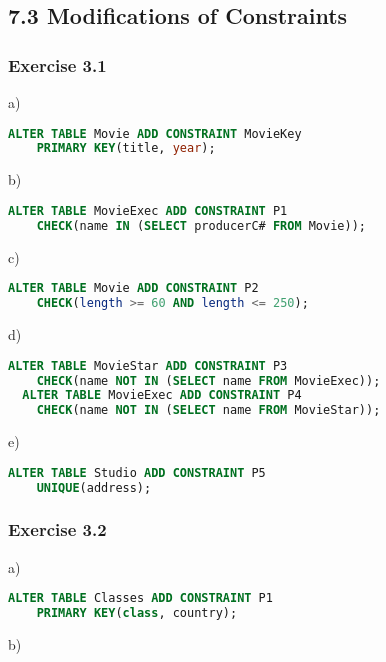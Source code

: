 \documentclass[../../main.tex]{subfiles}
\begin{document}
\subsection*{7.3 Modifications of Constraints}

\subsubsection*{Exercise 3.1}

a)

\begin{lstlisting}[language=sql]
  ALTER TABLE Movie ADD CONSTRAINT MovieKey
    PRIMARY KEY(title, year);
\end{lstlisting}

b)

\begin{lstlisting}[language=sql]
  ALTER TABLE MovieExec ADD CONSTRAINT P1
    CHECK(name IN (SELECT producerC# FROM Movie));
\end{lstlisting}

c)

\begin{lstlisting}[language=sql]
  ALTER TABLE Movie ADD CONSTRAINT P2
    CHECK(length >= 60 AND length <= 250);
\end{lstlisting}

d)

\begin{lstlisting}[language=sql]
  ALTER TABLE MovieStar ADD CONSTRAINT P3
    CHECK(name NOT IN (SELECT name FROM MovieExec));
  ALTER TABLE MovieExec ADD CONSTRAINT P4
    CHECK(name NOT IN (SELECT name FROM MovieStar));
\end{lstlisting}

e)

\begin{lstlisting}[language=sql]
  ALTER TABLE Studio ADD CONSTRAINT P5
    UNIQUE(address);
\end{lstlisting}

\subsubsection*{Exercise 3.2}

a)

\begin{lstlisting}[language=sql]
  ALTER TABLE Classes ADD CONSTRAINT P1
    PRIMARY KEY(class, country);
\end{lstlisting}

b)
\end{document}

